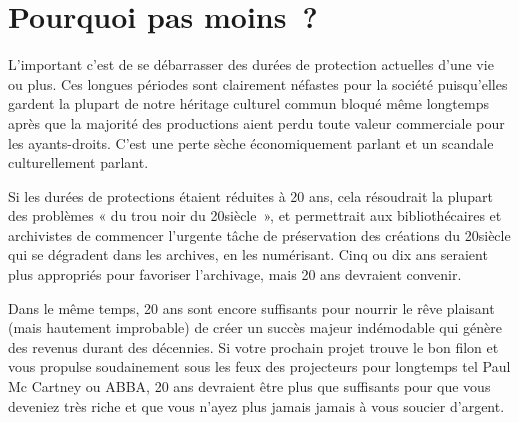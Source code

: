 \section{Pourquoi pas moins~?}

L’important c’est de se débarrasser des durées de protection actuelles d’une vie ou plus. Ces
longues périodes sont clairement néfastes pour la société puisqu’elles gardent la plupart de notre
héritage culturel commun bloqué même longtemps après que la majorité des productions aient perdu
toute valeur commerciale pour les ayants-droits. C’est une perte sèche économiquement parlant et un
scandale culturellement parlant.

Si les durées de protections étaient réduites à 20 ans, cela résoudrait la plupart des problèmes «
du trou noir du 20\ieme siècle~», et permettrait aux bibliothécaires et archivistes de commencer
l’urgente tâche de préservation des créations du 20\ieme siècle qui se dégradent dans les archives, en
les numérisant. Cinq ou dix ans seraient plus appropriés pour favoriser l’archivage, mais 20 ans
devraient convenir.

Dans le même temps, 20 ans sont encore suffisants pour nourrir le rêve plaisant (mais hautement
improbable) de créer un succès majeur indémodable qui génère des revenus durant des décennies. Si
votre prochain projet trouve le bon filon et vous propulse soudainement sous les feux des
projecteurs pour longtemps tel Paul Mc Cartney ou ABBA, 20 ans devraient
être plus que suffisants pour que vous deveniez très riche et que vous n’ayez plus jamais jamais à
vous soucier d’argent.
